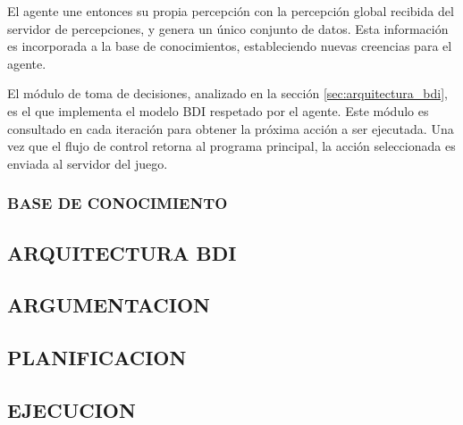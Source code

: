  El agente une entonces su propia percepción con la percepción global
 recibida del servidor de percepciones, y genera un único conjunto de
 datos.
 Esta información es incorporada a la base de conocimientos,
 estableciendo nuevas creencias para el agente.
 
 El módulo de toma de decisiones, analizado en la sección
 \ref{sec:arquitectura_bdi}, es el que implementa el modelo BDI
 respetado por el agente.
 Este módulo es consultado en cada iteración para obtener la próxima
 acción a ser ejecutada.
 Una vez que el flujo de control retorna al programa principal, la
 acción seleccionada es enviada al servidor del juego.
  
\subsubsection{BASE DE CONOCIMIENTO}

\subsection{ARQUITECTURA BDI}

\subsection{ARGUMENTACION}

\subsection{PLANIFICACION}

\subsection{EJECUCION}

